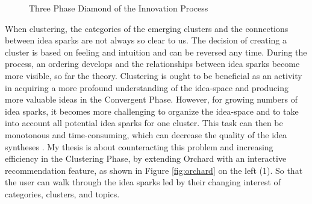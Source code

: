 \documentclass[pdftex,a4paper,12pt]{scrartcl}
\theoremstyle{definition}
\begin{document}
\begin{figure}[h]
    \centering
    \caption{Three Phase Diamond of the Innovation Process \citep{tassoul_clustering:_2007}}
    \label{fig:diamond}
\end{figure}

When clustering, the categories of the emerging clusters and the connections between idea sparks are not always so clear to us. The decision of creating a cluster is based on feeling and intuition and can be reversed any time. During the process, an ordering develops and the relationships between idea sparks become more visible, so far the theory.
Clustering is ought to be beneficial as an activity in acquiring a more profound understanding of the idea-space \citep{siangliulue_ideahound:_2016} and producing more valuable ideas in the Convergent Phase. However, for growing numbers of idea sparks, it becomes more challenging to organize the idea-space and to take into account all potential idea sparks for one cluster. This task can then be monotonous and time-consuming, which can decrease the quality of the idea syntheses \cite{siangliulue_supporting_2017}. My thesis is about counteracting this problem and increasing efficiency in the Clustering Phase, by extending Orchard with an interactive recommendation feature, as shown in Figure \ref{fig:orchard} on the left (1). So that the user can walk through the idea sparks led by their changing interest of categories, clusters, and topics.

   
\end{document}
